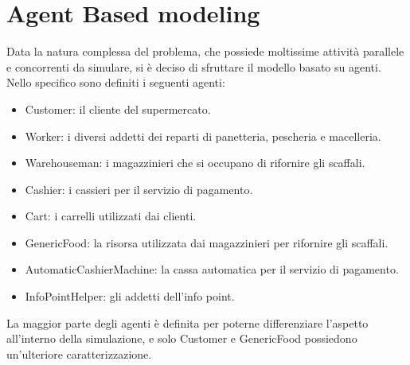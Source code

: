 \documentclass{article}
\begin{document}
\section{Agent Based modeling}
Data la natura complessa del problema, che possiede moltissime attività parallele e concorrenti da simulare, si è deciso di sfruttare il modello basato su agenti.
\newline
\newline
Nello specifico sono definiti i seguenti agenti:
\begin{itemize}
\item \textsf{Customer}:  il cliente del supermercato.
\item \textsf{Worker}:  i diversi addetti dei reparti di panetteria, pescheria e macelleria.
\item \textsf{Warehouseman}: i magazzinieri che si occupano di rifornire gli scaffali.
\item \textsf{Cashier}: i cassieri per il servizio di pagamento.
\item \textsf{Cart}: i carrelli utilizzati dai clienti.
\item \textsf{GenericFood}: la risorsa utilizzata dai magazzinieri per rifornire gli scaffali.
\item \textsf{AutomaticCashierMachine}: la cassa automatica per il servizio di pagamento.
\item \textsf{InfoPointHelper}: gli addetti dell'info point.
\end{itemize}

La maggior parte degli agenti è definita per poterne differenziare l'aspetto all'interno della simulazione, e solo \textsf{Customer} e \textsf{GenericFood} possiedono un'ulteriore caratterizzazione.
\end{document}
